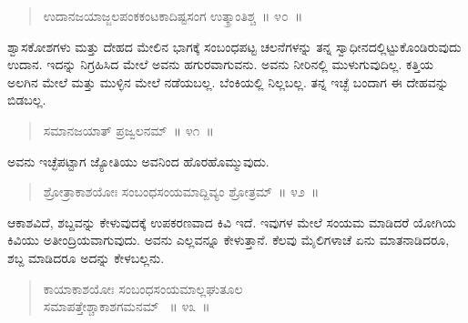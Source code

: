 \eject

\begin{verse}
ಉದಾನಜಯಾಜ್ಜಲಪಂಕಕಂಟಕಾದಿಷ್ಟಸಂಗ ಉತ್ಕ್ರಾಂತಿಶ್ಚ~॥ ೪೦~॥
\end{verse}

\vspace{-0.3cm}


ಶ್ವಾಸಕೋಶಗಳು ಮತ್ತು ದೇಹದ ಮೇಲಿನ ಭಾಗಕ್ಕೆ ಸಂಬಂಧಪಟ್ಟ ಚಲನೆಗಳನ್ನು ತನ್ನ ಸ್ವಾಧೀನದಲ್ಲಿಟ್ಟುಕೊಂಡಿರುವುದು ಉದಾನ. ಇದನ್ನು ನಿಗ್ರಹಿಸಿದ ಮೇಲೆ ಅವನು ಹಗುರವಾಗುವನು. ಅವನು ನೀರಿನಲ್ಲಿ ಮುಳುಗುವುದಿಲ್ಲ. ಕತ್ತಿಯ ಅಲಗಿನ ಮೇಲೆ ಮತ್ತು ಮುಳ್ಳಿನ ಮೇಲೆ ನಡೆಯಬಲ್ಲ. ಬೆಂಕಿಯಲ್ಲಿ ನಿಲ್ಲಬಲ್ಲ. ತನ್ನ ಇಚ್ಛೆ ಬಂದಾಗ ಈ ದೇಹವನ್ನು ಬಿಡಬಲ್ಲ. 

\vspace{-0.3cm}

\begin{verse}
ಸಮಾನಜಯಾತ್​ ಪ್ರಜ್ವಲನಮ್​~॥ ೪೧~॥
\end{verse}

\vspace{-0.3cm}


ಅವನು ಇಚ್ಛೆಪಟ್ಟಾಗ ಜ್ಯೋತಿಯು ಅವನಿಂದ ಹೊರಹೊಮ್ಮುವುದು. 

\vspace{-0.3cm}

\begin{verse}
ಶ್ರೋತ್ರಾಕಾಶಯೋಃ ಸಂಬಂಧಸಂಯಮಾದ್ದಿವ್ಯಂ ಶ್ರೋತ್ರಮ್​~॥ ೪೨~॥
\end{verse}

\vspace{-0.3cm}


ಆಕಾಶವಿದೆ, ಶಬ್ದವನ್ನು ಕೇಳುವುದಕ್ಕೆ ಉಪಕರಣವಾದ ಕಿವಿ ಇದೆ. ಇವುಗಳ ಮೇಲೆ ಸಂಯಮ ಮಾಡಿದರೆ ಯೋಗಿಯ ಕಿವಿಯು ಅತೀಂದ್ರಿಯವಾಗುವುದು. ಅವನು ಎಲ್ಲವನ್ನೂ ಕೇಳುತ್ತಾನೆ. ಕೆಲವು ಮೈಲಿಗಳಾಚೆ ಏನು ಮಾತನಾಡಿದರೂ, ಶಬ್ದ ಮಾಡಿದರೂ ಅದನ್ನು ಕೇಳಬಲ್ಲನು. 

\vspace{-0.3cm}

\begin{verse}
ಕಾಯಾಕಾಶಯೋಃ ಸಂಬಂಧಸಂಯಮಾಲ್ಲಘುತೂಲ\\ ಸಮಾಪತ್ತೇಶ್ಚಾಕಾಶಗಮನಮ್​~ \hfill{॥ ೪೩~॥}
\end{verse}

\vspace{-0.3cm}

